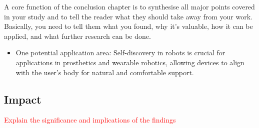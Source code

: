 \documentclass[12pt, a4paper]{article}
\newcommand{\redtext}[1]{\textcolor{red}{#1}}
\begin{document}
A core function of the conclusion chapter is to synthesise all major points covered in your study and to tell the reader what they should take away from your work. Basically, you need to tell them what you found, why it’s valuable, how it can be applied, and what further research can be done.


\begin{itemize}
	\item One potential application area: Self-discovery in robots is crucial for applications in prosthetics and wearable robotics, allowing devices to align with the user's body for natural and comfortable support.
\end{itemize}

\subsection*{Impact}
\redtext{Explain the significance and implications of the findings}
\end{document}
